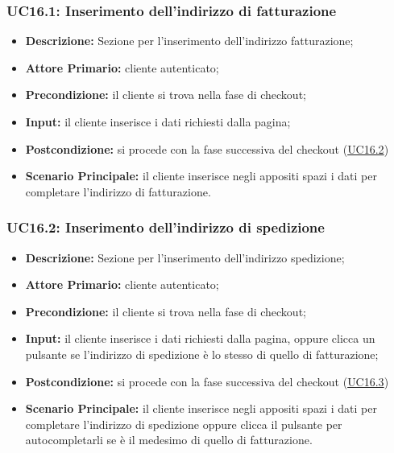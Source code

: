             \subsubsection{UC16.1: Inserimento dell'indirizzo di fatturazione}
            \label{sec:UC16.1}
                \begin{itemize}
                    \item \textbf{Descrizione:} Sezione per l'inserimento dell'indirizzo fatturazione;
                    \item \textbf{Attore Primario:} cliente autenticato;
                    \item \textbf{Precondizione:} il cliente si trova nella fase di checkout;
                    \item \textbf{Input:} il cliente inserisce i dati richiesti dalla pagina;
                    \item \textbf{Postcondizione:} si procede con la fase successiva del checkout (\hyperref[sec:UC16.2]{UC16.2})
                    \item \textbf{Scenario Principale:} il cliente inserisce negli appositi spazi i dati per completare l'indirizzo di fatturazione.
                \end{itemize}
            \subsubsection{UC16.2: Inserimento dell'indirizzo di spedizione}
            \label{sec:UC16.2}
                \begin{itemize}
                    \item \textbf{Descrizione:} Sezione per l'inserimento dell'indirizzo spedizione;
                    \item \textbf{Attore Primario:} cliente autenticato;
                    \item \textbf{Precondizione:} il cliente si trova nella fase di checkout;
                    \item \textbf{Input:} il cliente inserisce i dati richiesti dalla pagina, oppure clicca un pulsante se l'indirizzo di spedizione è lo stesso di quello di fatturazione;
                    \item \textbf{Postcondizione:} si procede con la fase successiva del checkout (\hyperref[sec:UC16.3]{UC16.3})
                    \item \textbf{Scenario Principale:} il cliente inserisce negli appositi spazi i dati per completare l'indirizzo di spedizione oppure clicca il pulsante per autocompletarli se è il medesimo di quello di fatturazione.
                \end{itemize}
